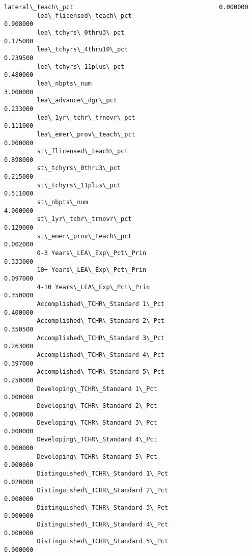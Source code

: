 \documentclass[11pt]{article}
\begin{document}
\begin{Verbatim}[commandchars=\\\{\}]
         lateral\_teach\_pct                                        0.000000   
         lea\_flicensed\_teach\_pct                                  0.908000   
         lea\_tchyrs\_0thru3\_pct                                    0.175000   
         lea\_tchyrs\_4thru10\_pct                                   0.239500   
         lea\_tchyrs\_11plus\_pct                                    0.480000   
         lea\_nbpts\_num                                            3.000000   
         lea\_advance\_dgr\_pct                                      0.233000   
         lea\_1yr\_tchr\_trnovr\_pct                                  0.111000   
         lea\_emer\_prov\_teach\_pct                                  0.000000   
         st\_flicensed\_teach\_pct                                   0.898000   
         st\_tchyrs\_0thru3\_pct                                     0.215000   
         st\_tchyrs\_11plus\_pct                                     0.511000   
         st\_nbpts\_num                                             4.000000   
         st\_1yr\_tchr\_trnovr\_pct                                   0.129000   
         st\_emer\_prov\_teach\_pct                                   0.002000   
         0-3 Years\_LEA\_Exp\_Pct\_Prin                               0.333000   
         10+ Years\_LEA\_Exp\_Pct\_Prin                               0.097000   
         4-10 Years\_LEA\_Exp\_Pct\_Prin                              0.350000   
         Accomplished\_TCHR\_Standard 1\_Pct                         0.400000   
         Accomplished\_TCHR\_Standard 2\_Pct                         0.350500   
         Accomplished\_TCHR\_Standard 3\_Pct                         0.263000   
         Accomplished\_TCHR\_Standard 4\_Pct                         0.397000   
         Accomplished\_TCHR\_Standard 5\_Pct                         0.250000   
         Developing\_TCHR\_Standard 1\_Pct                           0.000000   
         Developing\_TCHR\_Standard 2\_Pct                           0.000000   
         Developing\_TCHR\_Standard 3\_Pct                           0.000000   
         Developing\_TCHR\_Standard 4\_Pct                           0.000000   
         Developing\_TCHR\_Standard 5\_Pct                           0.000000   
         Distinguished\_TCHR\_Standard 1\_Pct                        0.020000   
         Distinguished\_TCHR\_Standard 2\_Pct                        0.000000   
         Distinguished\_TCHR\_Standard 3\_Pct                        0.000000   
         Distinguished\_TCHR\_Standard 4\_Pct                        0.000000   
         Distinguished\_TCHR\_Standard 5\_Pct                        0.000000   

\end{Verbatim}
\end{document}
